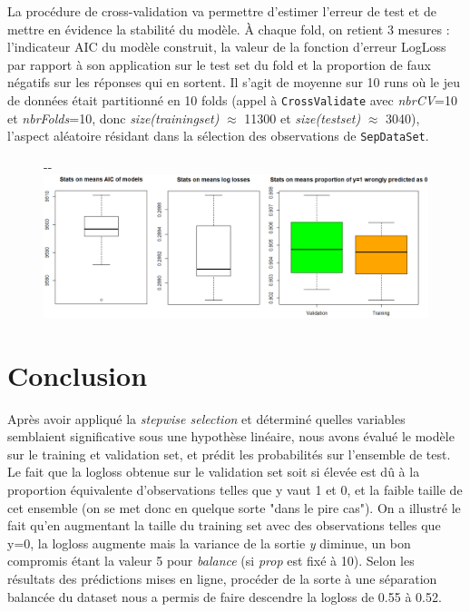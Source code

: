 \documentclass[]{article}
\begin{document}
\newpage

La procédure de cross-validation va permettre d'estimer l'erreur de test et de mettre en évidence la stabilité du modèle. À chaque fold, on retient 3 mesures : l'indicateur AIC du modèle construit, la valeur de la fonction d'erreur LogLoss par rapport à son application sur le test set du fold et la proportion de faux négatifs sur les réponses qui en sortent. Il s'agit de moyenne sur 10 runs où le jeu de données était partitionné en 10 folds (appel à \texttt{CrossValidate} avec \textit{nbrCV}=10 et \textit{nbrFolds}=10, donc \textit{size(trainingset)} $\approx$ 11300 et \textit{size(testset)} $\approx$ 3040), l'aspect aléatoire résidant dans la sélection des observations de \texttt{SepDataSet}.


\begin{figure}[!ht]
   \begin{adjustwidth}{-\oddsidemargin-1in}{-\rightmargin}
     \centering
     \includegraphics[width=\textwidth]{cv2}
   \end{adjustwidth}
\end{figure}

\vspace{-1cm}
\section{Conclusion}

Après avoir appliqué la \textit{stepwise selection} et déterminé quelles variables semblaient significative sous une hypothèse linéaire, nous avons évalué le modèle sur le training et validation set, et prédit les probabilités sur l'ensemble de test. Le fait que la logloss obtenue sur le validation set soit si élevée est dû à la proportion équivalente d'observations telles que y vaut 1 et 0, et la faible taille de cet ensemble (on se met donc en quelque sorte "dans le pire cas"). On a illustré le fait qu'en augmentant la taille du training set avec des observations telles que y=0, la logloss augmente mais la variance de la sortie \textit{y} diminue, un bon compromis étant la valeur 5 pour \textit{balance} (si \textit{prop} est fixé à 10). Selon les résultats des prédictions mises en ligne, procéder de la sorte à une séparation balancée du dataset nous a permis de faire descendre la logloss de 0.55 à 0.52.\\
\end{document}
